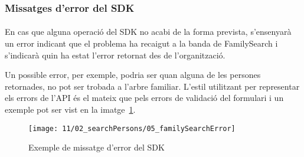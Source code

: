 \subsubsection{Missatges d'error del SDK}

\paragraph{}
En cas que alguna operació del SDK no acabi de la forma prevista, s'ensenyarà un error indicant que el problema ha recaigut a la banda de FamilySearch i s'indicarà quin ha estat l'error retornat des de l'organització.

Un possible error, per exemple, podria ser quan alguna de les persones retornades, no pot ser trobada a l'arbre familiar. L'estil utilitzant per representar els errors de l'API és el mateix que pels errors de validació del formulari i un exemple pot ser vist en la imatge~\ref{fig:fsError}.

\begin{figure}[h]
    \texttt{[image: 11/02\_searchPersons/05\_familySearchError]}
    \centering
    \caption{Exemple de missatge d'error del SDK}\label{fig:fsError}
\end{figure}
